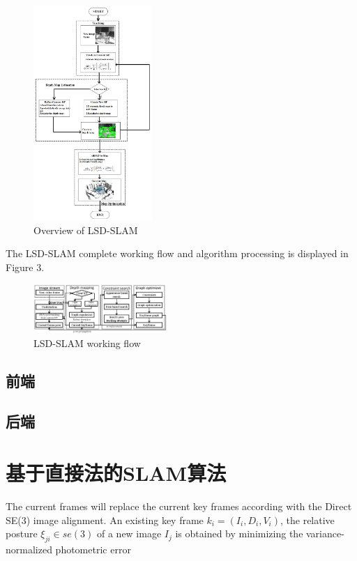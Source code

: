 \begin{figure}
  \centering
  \includegraphics[width=0.4\textwidth, height=0.6\textwidth]{figures/Fig2}
  \caption{Overview of LSD-SLAM}
\end{figure}

The LSD-SLAM complete working flow and algorithm processing is displayed in Figure 3.

\begin{figure}
  \centering
  \includegraphics[width=0.45\textwidth]{figures/Fig3(2)}
  \caption{LSD-SLAM working flow}
\end{figure}

\subsection{前端}

\subsection{后端}


\section{基于直接法的SLAM算法}
The current frames will replace the current key frames according with the Direct SE(3) image alignment. An existing key frame ${k_i} = ({I_i},{D_i},{V_i})$, the relative posture ${\xi _{ji}} \in se(3)$ of a new image ${I_j}$ is obtained by minimizing the variance-normalized photometric error

